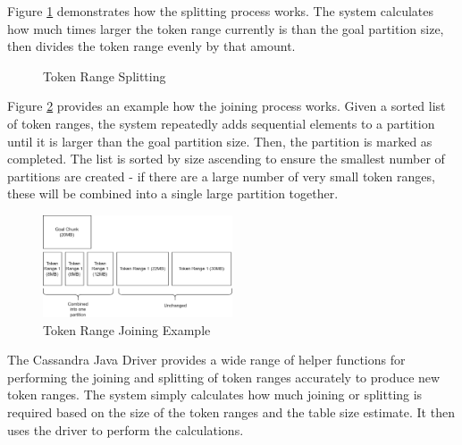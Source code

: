 Figure \ref{fig:cassandra-split-process} demonstrates how the splitting process works. The system calculates how much times larger the token range currently is than the goal partition size, then divides the token range evenly by that amount.

\begin{figure}[h]
	\centering
	\qquad
	\caption{Token Range Splitting}
	\label{fig:cassandra-split-process}
\end{figure}

Figure \ref{fig:cassandra-join-process} provides an example how the joining process works. Given a sorted list of token ranges, the system repeatedly adds sequential elements to a partition until it is larger than the goal partition size. Then, the partition is marked as completed. The list is sorted by size ascending to ensure the smallest number of partitions are created - if there are a large number of very small token ranges, these will be combined into a single large partition together.

\begin{figure}[h]
	\centering
	\includegraphics[width=0.5\textwidth]{chapters/diagrams/implementation/cassandra-join-example}
	\caption{Token Range Joining Example}
	\label{fig:cassandra-join-process}
\end{figure}

The Cassandra Java Driver provides a wide range of helper functions for performing the joining and splitting of token ranges accurately to produce new token ranges. The system simply calculates how much joining or splitting is required based on the size of the token ranges and the table size estimate. It then uses the driver to perform the calculations.

